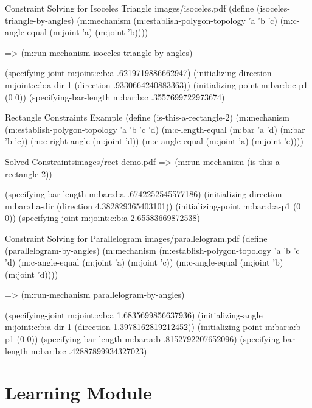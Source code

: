 \begin{pdf-example}{Constraint Solving for Isoceles Triangle}
{images/isoceles.pdf}
(define (isoceles-triangle-by-angles)
  (m:mechanism
   (m:establish-polygon-topology 'a 'b 'c)
   (m:c-angle-equal (m:joint 'a)
                    (m:joint 'b))))

=> (m:run-mechanism  isoceles-triangle-by-angles)

(specifying-joint m:joint:c:b:a .6219719886662947)
(initializing-direction m:joint:c:b:a-dir-1 (direction .9330664240883363))
(initializing-point m:bar:b:c-p1 (0 0))
(specifying-bar-length m:bar:b:c .3557699722973674)
\end{pdf-example}

\begin{code-example}
{Rectangle Constraints Example}
(define (is-this-a-rectangle-2)
  (m:mechanism
   (m:establish-polygon-topology 'a 'b 'c 'd)
   (m:c-length-equal (m:bar 'a 'd)
                     (m:bar 'b 'c))
   (m:c-right-angle (m:joint 'd))
   (m:c-angle-equal (m:joint 'a)
                    (m:joint 'c))))
\end{code-example}

\begin{pdf-example}{Solved Constraints}{images/rect-demo.pdf}
=> (m:run-mechanism (is-this-a-rectangle-2))

(specifying-bar-length m:bar:d:a .6742252545577186)
(initializing-direction m:bar:d:a-dir (direction 4.382829365403101))
(initializing-point m:bar:d:a-p1 (0 0))
(specifying-joint m:joint:c:b:a 2.65583669872538)
\end{pdf-example}

\begin{pdf-example}{Constraint Solving for Parallelogram}
{images/parallelogram.pdf}
(define (parallelogram-by-angles)
  (m:mechanism
   (m:establish-polygon-topology 'a 'b 'c 'd)
   (m:c-angle-equal (m:joint 'a)
                    (m:joint 'c))
   (m:c-angle-equal (m:joint 'b)
                    (m:joint 'd))))

=> (m:run-mechanism parallelogram-by-angles)

(specifying-joint m:joint:c:b:a 1.6835699856637936)
(initializing-angle m:joint:c:b:a-dir-1 (direction 1.3978162819212452))
(initializing-point m:bar:a:b-p1 (0 0))
(specifying-bar-length m:bar:a:b .8152792207652096)
(specifying-bar-length m:bar:b:c .42887899934327023)
\end{pdf-example}

\section{Learning Module}

